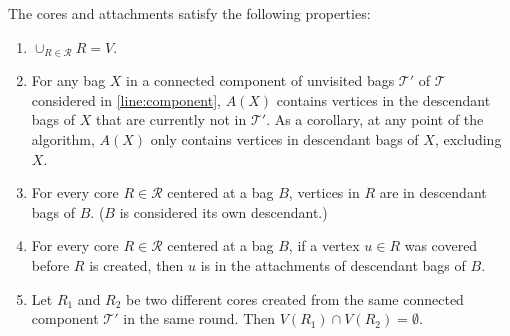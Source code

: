 \documentclass{theoretics}
\newcommand{\mt}{\mathcal{T}}
\def\coreSet{\mathcal{R}}
\def\core{R}
\begin{document}
\begin{claim}\label{clm:core-region-prop}  The cores and attachments satisfy the following properties:
	\begin{enumerate}
		\item\label{it:core-covering} $\cup_{\core \in \coreSet}\core =  V$. 
		\item\label{it:attac-des} For any bag $X$ in a connected component of unvisited bags $\mathcal{T}'$ of $\mathcal{T}$ considered in  \cref{line:component}, $A(X)$ contains vertices in the descendant bags of $X$ that are currently not in $\mathcal{T}'$. As a corollary, at any point of the algorithm, $A(X)$ only contains vertices in descendant bags of $X$, excluding~$X$.
		\item  \label{it:topdown-carving} For every core $\core\in \coreSet$ centered at a bag $B$, vertices in $R$ are in descendant bags of $B$. ($B$ is considered its own descendant.) 
		\item \label{it:covered-attac}  For every core $\core \in \coreSet$ centered at a bag $B$, if a vertex $u\in \core$ was covered before $\core$ is created, then $u$ is in the attachments of descendant bags of $B$. 
		\item \label{it:core-dijst}  Let $\core_1$ and $\core_2$ be two different cores created from the same connected component $\mt'$ in the same round. Then $V(\core_1)\cap V(\core_2) = \emptyset$. 
	\end{enumerate}    
\end{claim}
\end{document}
